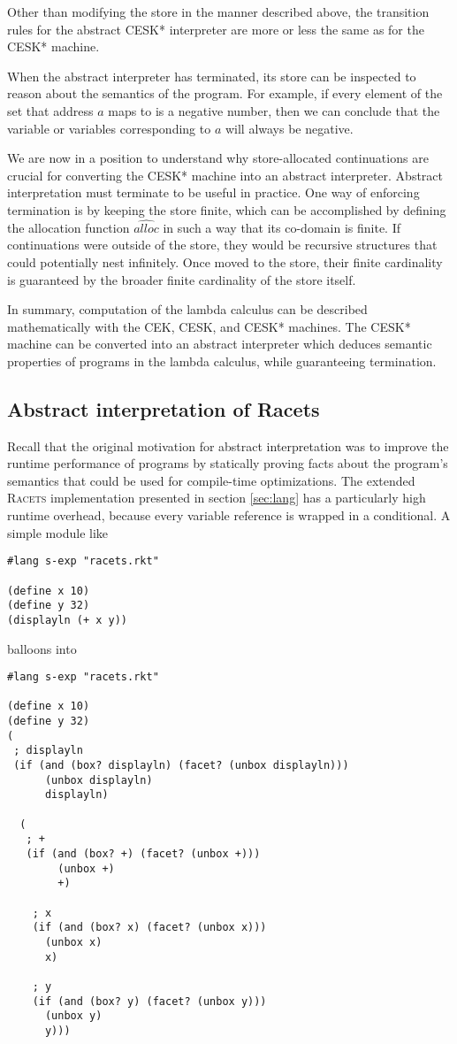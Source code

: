 \documentclass{article}
\begin{document}
Other than modifying the store in the manner described above, the transition rules for the abstract CESK* interpreter are more or less the same as for the CESK* machine.

When the abstract interpreter has terminated, its store can be inspected to reason about the semantics of the program. For example, if every element of the set that address $a$ maps to is a negative number, then we can conclude that the variable or variables corresponding to $a$ will always be negative.

We are now in a position to understand why store-allocated continuations are crucial for converting the CESK* machine into an abstract interpreter. Abstract interpretation must terminate to be useful in practice. One way of enforcing termination is by keeping the store finite, which can be accomplished by defining the allocation function $\widehat{alloc}$ in such a way that its co-domain is finite. If continuations were outside of the store, they would be recursive structures that could potentially nest infinitely. Once moved to the store, their finite cardinality is guaranteed by the broader finite cardinality of the store itself.

In summary, computation of the lambda calculus can be described mathematically with the CEK, CESK, and CESK* machines. The CESK* machine can be converted into an abstract interpreter which deduces semantic properties of programs in the lambda calculus, while guaranteeing termination.


\subsection{Abstract interpretation of Racets}
Recall that the original motivation for abstract interpretation was to improve the runtime performance of programs by statically proving facts about the program's semantics that could be used for compile-time optimizations. The extended \textsc{Racets} implementation presented in section \ref{sec:lang} has a particularly high runtime overhead, because every variable reference is wrapped in a conditional. A simple module like

\begin{lstlisting}
#lang s-exp "racets.rkt"

(define x 10)
(define y 32)
(displayln (+ x y))
\end{lstlisting}

\noindent balloons into

\begin{lstlisting}
#lang s-exp "racets.rkt"

(define x 10)
(define y 32)
(
 ; displayln
 (if (and (box? displayln) (facet? (unbox displayln)))
      (unbox displayln)
      displayln)

  (
   ; +
   (if (and (box? +) (facet? (unbox +)))
        (unbox +)
        +)

    ; x
    (if (and (box? x) (facet? (unbox x)))
      (unbox x)
      x)

    ; y
    (if (and (box? y) (facet? (unbox y)))
      (unbox y)
      y)))
\end{lstlisting}
\end{document}
